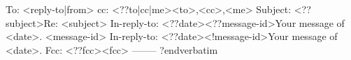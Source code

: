 

\verbatim
To: <reply-to|from>
cc: <??to|cc|me><to>,<cc>,<me>
Subject: <??subject>Re: <subject>
In-reply-to: <??date><??message-id>Your message of <date>.
	     <message-id>
In-reply-to: <??date><!message-id>Your message of <date>.
Fcc: <??fcc><fcc>
--------
?endverbatim
